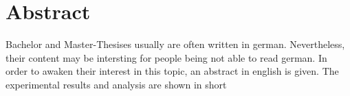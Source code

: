 

\section*{Abstract}
Bachelor  and Master-Thesises usually  are often  written in  german. Nevertheless,
their content may be intersting for people  being not able to read german. In order
to  awaken their interest  in this  topic, an  abstract in  english is  given.  The
experimental results and analysis are shown in short

